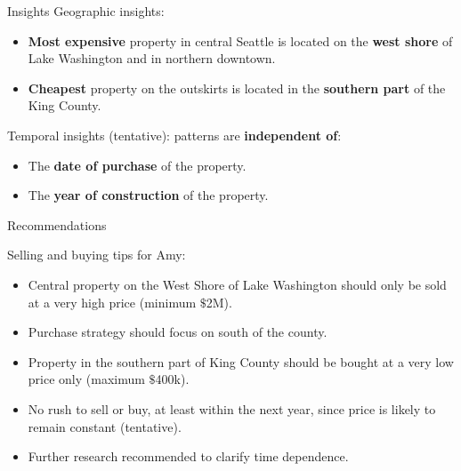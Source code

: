 \documentclass{beamer}
\begin{document}
\begin{frame}{Insights}
\pause
Geographic insights:

\begin{itemize}
\item{\textbf{Most expensive} property in central Seattle is located on the \textbf{west shore} of Lake Washington and in northern downtown.}
\item{\textbf{Cheapest} property on the outskirts is located in the \textbf{southern part} of the King County.} \pause
\end{itemize}

Temporal insights (tentative): patterns are \textbf{independent of}:
\begin{itemize}
\item{The \textbf{date of purchase} of the property.}
\item{The \textbf{year of construction} of the property.}
\end{itemize} 


\end{frame}

\begin{frame}{Recommendations}

Selling and buying tips for Amy:

\begin{itemize}
\item{Central property on the West Shore of Lake Washington should only be sold at a very high price (minimum $\$$2M).}
\item{Purchase strategy should focus on south of the county.}
\item{Property in the southern part of King County should be bought at a very low price only (maximum $\$$400k).}
\item{No rush to sell or buy, at least within the next year, since price is likely to remain constant (tentative).}
\item{Further research recommended to clarify time dependence.}
\end{itemize}

\end{frame}
\end{document}

